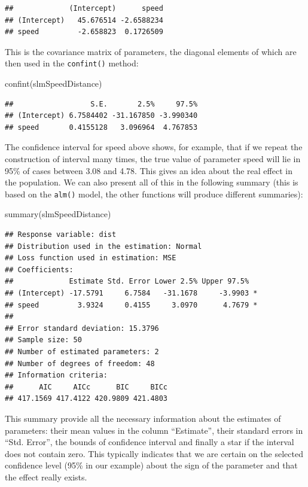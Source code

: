 \documentclass[
]{book}
\newenvironment{Shaded}{\begin{snugshade}}{\end{snugshade}}
\newcommand{\FunctionTok}[1]{\textcolor[rgb]{0.00,0.00,0.00}{#1}}
\newcommand{\NormalTok}[1]{#1}
\theoremstyle{definition}
\theoremstyle{definition}
\theoremstyle{definition}
\theoremstyle{definition}
\theoremstyle{remark}
\begin{document}
\begin{verbatim}
##             (Intercept)      speed
## (Intercept)   45.676514 -2.6588234
## speed         -2.658823  0.1726509
\end{verbatim}

This is the covariance matrix of parameters, the diagonal elements of which are then used in the \texttt{confint()} method:

\begin{Shaded}
\begin{Highlighting}[]
\FunctionTok{confint}\NormalTok{(slmSpeedDistance)}
\end{Highlighting}
\end{Shaded}

\begin{verbatim}
##                  S.E.       2.5%     97.5%
## (Intercept) 6.7584402 -31.167850 -3.990340
## speed       0.4155128   3.096964  4.767853
\end{verbatim}

The confidence interval for speed above shows, for example, that if we repeat the construction of interval many times, the true value of parameter speed will lie in 95\% of cases between 3.08 and 4.78. This gives an idea about the real effect in the population. We can also present all of this in the following summary (this is based on the \texttt{alm()} model, the other functions will produce different summaries):

\begin{Shaded}
\begin{Highlighting}[]
\FunctionTok{summary}\NormalTok{(slmSpeedDistance)}
\end{Highlighting}
\end{Shaded}

\begin{verbatim}
## Response variable: dist
## Distribution used in the estimation: Normal
## Loss function used in estimation: MSE
## Coefficients:
##             Estimate Std. Error Lower 2.5% Upper 97.5%  
## (Intercept) -17.5791     6.7584   -31.1678     -3.9903 *
## speed         3.9324     0.4155     3.0970      4.7679 *
## 
## Error standard deviation: 15.3796
## Sample size: 50
## Number of estimated parameters: 2
## Number of degrees of freedom: 48
## Information criteria:
##      AIC     AICc      BIC     BICc 
## 417.1569 417.4122 420.9809 421.4803
\end{verbatim}

This summary provide all the necessary information about the estimates of parameters: their mean values in the column ``Estimate'', their standard errors in ``Std. Error'', the bounds of confidence interval and finally a star if the interval does not contain zero. This typically indicates that we are certain on the selected confidence level (95\% in our example) about the sign of the parameter and that the effect really exists.
\end{document}
